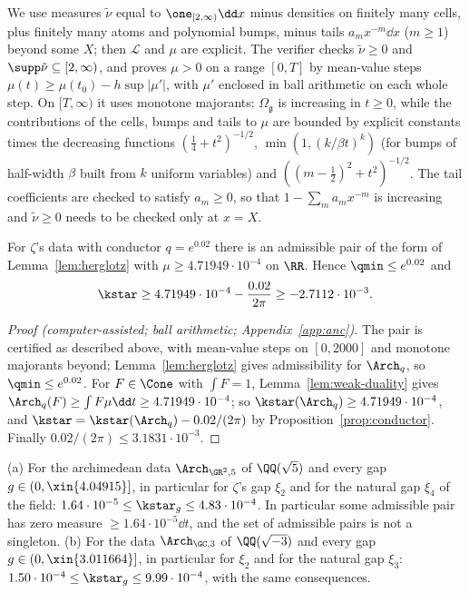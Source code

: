 We use measures $\tilde\nu$ equal to $\one_{[2,\infty)}\dd x$ minus densities on finitely many cells, plus finitely many atoms and polynomial
bumps, minus tails $a_mx^{-m}\dd x$ ($m\ge1$) beyond some $X$; then $\mathcal L$ and $\mu$ are explicit. The verifier checks $\tilde\nu\ge0$ and
$\supp\tilde\nu\subseteq[2,\infty)$, and proves $\mu>0$ on a range $[0,T]$ by mean-value steps $\mu(t)\ge\mu(t_0)-h\sup\lvert\mu'\rvert$, with
$\mu'$ enclosed in ball arithmetic on each whole step. On $[T,\infty)$ it uses monotone majorants: $\Omega_{\mathfrak g}$ is increasing in $t\ge0$,
while the contributions of the cells, bumps and tails to $\mu$ are bounded by explicit constants times the decreasing functions
$(\frac14+t^2)^{-1/2}$, $\min(1,(k/\beta t)^k)$ (for bumps of half-width $\beta$ built from $k$ uniform variables) and
$((m-\frac12)^2+t^2)^{-1/2}$. The tail coefficients are checked to satisfy $a_m\ge0$, so that $1-\sum_ma_mx^{-m}$ is increasing and
$\tilde\nu\ge0$ needs to be checked only at $x=X$.

\begin{proposition}\label{prop:lowerbound}
For $\zeta$'s data with conductor $q=e^{0.02}$ there is an admissible pair of the form of Lemma~\ref{lem:herglotz} with
$\mu\ge4.71949\cdot10^{-4}$ on $\RR$. Hence $\qmin\le e^{0.02}$ and
\[
\kstar\ge4.71949\cdot10^{-4}-\frac{0.02}{2\pi}\ge-2.7112\cdot10^{-3}.
\]
\end{proposition}

\begin{proof}[Proof (computer-assisted; ball arithmetic; Appendix~\ref{app:anc})]
The pair is certified as described above, with mean-value steps on $[0,2000]$ and monotone majorants beyond; Lemma~\ref{lem:herglotz} gives
admissibility for $\Arch_q$, so $\qmin\le e^{0.02}$. For $F\in\Cone$ with $\int F=1$, Lemma~\ref{lem:weak-duality} gives
$\Arch_q(F)\ge\int F\mu\dd t\ge4.71949\cdot10^{-4}$; so $\kstar(\Arch_q)\ge4.71949\cdot10^{-4}$, and $\kstar=\kstar(\Arch_q)-0.02/(2\pi)$ by
Proposition~\ref{prop:conductor}. Finally $0.02/(2\pi)\le3.1831\cdot10^{-3}$.
\end{proof}

\begin{proposition}\label{thm:notcritical}
\textup{(a)} For the archimedean data $\Arch_{\GR^2,5}$ of $\QQ(\sqrt5)$ and every gap $g\in(0,\xin{4.04915}]$, in particular for $\zeta$'s gap
$\xi_2$ and for the natural gap $\xi_4$ of the field: $1.64\cdot10^{-5}\le\kstar_g\le4.83\cdot10^{-4}$. In particular some admissible pair has zero
measure $\ge1.64\cdot10^{-5}\dd t$, and the set of admissible pairs is not a singleton.
\textup{(b)} For the data $\Arch_{\GC,3}$ of $\QQ(\sqrt{-3})$ and every gap $g\in(0,\xin{3.011664}]$, in particular for $\xi_2$ and for the natural
gap $\xi_3$: $1.50\cdot10^{-4}\le\kstar_g\le9.99\cdot10^{-4}$, with the same consequences.
\end{proposition}

